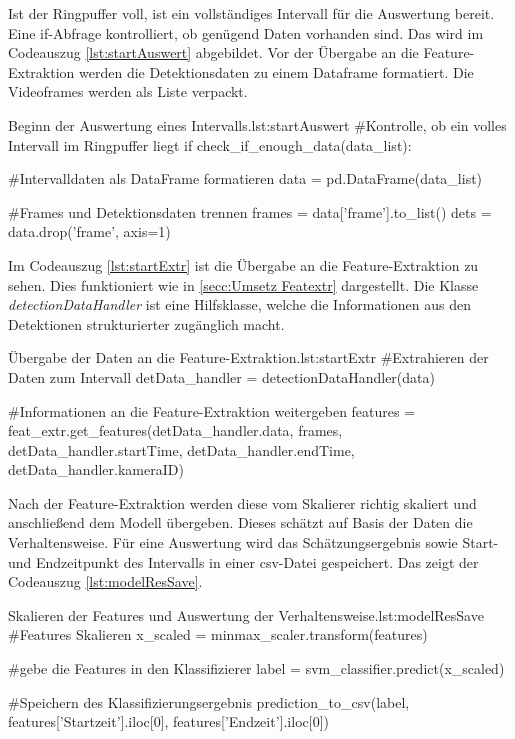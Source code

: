Ist der Ringpuffer voll, ist ein vollständiges Intervall für die Auswertung bereit. Eine if-Abfrage kontrolliert, ob genügend Daten vorhanden sind. Das wird im Codeauszug \ref{lst:startAuswert} abgebildet. Vor der Übergabe an die Feature-Extraktion werden die Detektionsdaten zu einem Dataframe formatiert. Die Videoframes werden als Liste verpackt. 

\begin{pythoncode}{Beginn der Auswertung eines Intervalls.}{lst:startAuswert}
#Kontrolle, ob ein volles Intervall im Ringpuffer liegt
if check_if_enough_data(data_list):

    #Intervalldaten als DataFrame formatieren 
    data = pd.DataFrame(data_list)

    #Frames und Detektionsdaten trennen 
    frames = data['frame'].to_list()
    dets = data.drop('frame', axis=1)
\end{pythoncode}

Im Codeauszug \ref{lst:startExtr} ist die Übergabe an die Feature-Extraktion zu sehen. Dies funktioniert wie in \autoref{secc:Umsetz Featextr} dargestellt. Die Klasse \textit{detectionDataHandler} ist eine Hilfsklasse, welche die Informationen aus den Detektionen strukturierter zugänglich macht. 

\begin{pythoncode}{Übergabe der Daten an die Feature-Extraktion.}{lst:startExtr}
#Extrahieren der Daten zum Intervall 
detData_handler = detectionDataHandler(data)

#Informationen an die Feature-Extraktion weitergeben
features = feat_extr.get_features(detData_handler.data, 
                                frames, 
                                detData_handler.startTime, 
                                detData_handler.endTime, 
                                detData_handler.kameraID)
\end{pythoncode}

Nach der Feature-Extraktion werden diese vom Skalierer richtig skaliert und anschließend dem Modell übergeben. Dieses schätzt auf Basis der Daten die Verhaltensweise. Für eine Auswertung wird das Schätzungsergebnis sowie Start- und Endzeitpunkt des Intervalls in einer csv-Datei gespeichert. Das zeigt der Codeauszug \ref{lst:modelResSave}.

\begin{pythoncode}{Skalieren der Features und Auswertung der Verhaltensweise.}{lst:modelResSave}
#Features Skalieren
x_scaled = minmax_scaler.transform(features) 

#gebe die Features in den Klassifizierer
label = svm_classifier.predict(x_scaled)

#Speichern des Klassifizierungsergebnis
prediction_to_csv(label, 
                  features['Startzeit'].iloc[0], 
                  features['Endzeit'].iloc[0])
\end{pythoncode}


                